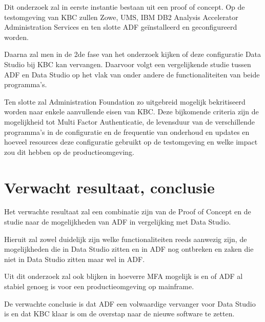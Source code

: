 Dit onderzoek zal in eerste instantie bestaan uit een proof of concept. Op de testomgeving van KBC zullen Zowe, UMS,  IBM DB2 Analysis Accelerator Administration Services en ten slotte ADF geïnstalleerd en geconfigureerd worden.

Daarna zal men in de 2de fase van het onderzoek kijken of deze configuratie Data Studio bij KBC kan vervangen. Daarvoor volgt een vergelijkende studie tussen ADF en Data Studio op het vlak van onder andere de functionaliteiten van beide programma’s.

Ten slotte zal Administration Foundation zo uitgebreid mogelijk bekritiseerd worden naar enkele aanvullende eisen van KBC. Deze bijkomende criteria zijn de mogelijkheid tot Multi Factor Authenticatie, de levensduur van de verschillende programma’s in de configuratie en de frequentie van onderhoud en updates en hoeveel resources deze configuratie gebruikt op de testomgeving en welke impact zou dit hebben op de productieomgeving.



\section{Verwacht resultaat, conclusie}%
\label{sec:verwachte_resultaten}

Het verwachte resultaat zal een combinatie zijn van de Proof of Concept en de studie naar de mogelijkheden van ADF in vergelijking met Data Studio. 

Hieruit zal zowel duidelijk zijn welke functionaliteiten reeds aanwezig zijn, de mogelijkheden die in Data Studio zitten en in ADF nog ontbreken en zaken die niet in Data Studio zitten maar wel in ADF.

Uit dit onderzoek zal ook blijken in hoeverre MFA mogelijk is en of ADF al stabiel genoeg is voor een productieomgeving op mainframe.

De verwachte conclusie is dat ADF een volwaardige vervanger voor Data Studio is en dat KBC klaar is om de overstap naar de nieuwe software te zetten.

